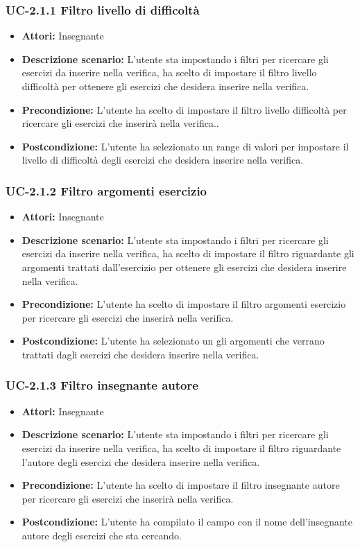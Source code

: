 \subsubsection{UC-2.1.1 Filtro livello di difficoltà}
\begin{itemize}
		\item \textbf{Attori: } Insegnante
		\item \textbf{Descrizione scenario: }L'utente sta impostando i filtri per ricercare gli esercizi da inserire nella verifica, ha scelto di impostare il filtro livello difficoltà per ottenere gli esercizi che desidera inserire nella verifica.
		\item \textbf{Precondizione: }L'utente ha scelto di impostare il filtro livello difficoltà per ricercare gli esercizi che inserirà nella verifica..
		\item \textbf{Postcondizione: }L'utente ha selezionato un range di valori per impostare il livello di difficoltà degli esercizi che desidera inserire nella verifica.
\end{itemize}
\subsubsection{UC-2.1.2 Filtro argomenti esercizio}
\begin{itemize}
		\item \textbf{Attori: } Insegnante
		\item \textbf{Descrizione scenario: }L'utente sta impostando i filtri per ricercare gli esercizi da inserire nella verifica, ha scelto di impostare il filtro riguardante gli argomenti trattati dall'esercizio per ottenere gli esercizi che desidera inserire nella verifica.
		\item \textbf{Precondizione: }L'utente ha scelto di impostare il filtro argomenti esercizio per ricercare gli esercizi che inserirà nella verifica.
		\item \textbf{Postcondizione: }L'utente ha selezionato un gli argomenti che verrano trattati dagli esercizi che desidera inserire nella verifica.
\end{itemize}
\subsubsection{UC-2.1.3 Filtro insegnante autore}
\begin{itemize}
		\item \textbf{Attori: } Insegnante
		\item \textbf{Descrizione scenario: }L'utente sta impostando i filtri per ricercare gli esercizi da inserire nella verifica, ha scelto di impostare il filtro riguardante l'autore degli esercizi che desidera inserire nella verifica.
		\item \textbf{Precondizione: }L'utente ha scelto di impostare il filtro insegnante autore per ricercare gli esercizi che inserirà nella verifica.
		\item \textbf{Postcondizione: }L'utente ha compilato il campo con il nome dell'insegnante autore degli esercizi che sta cercando.
\end{itemize}
